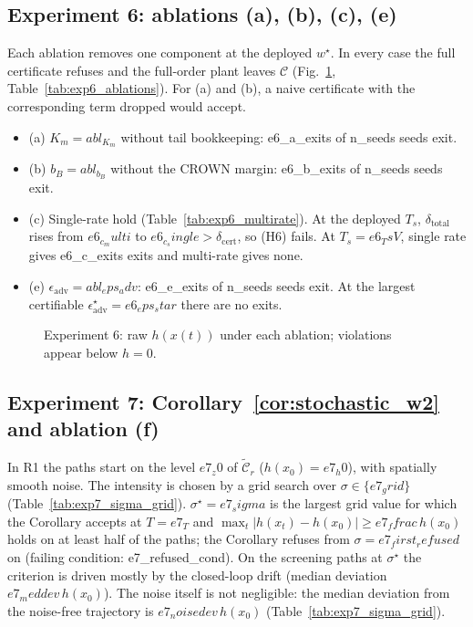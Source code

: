 \subsection{Experiment 6: ablations (a), (b), (c), (e)}
Each ablation removes one component at the deployed \(w^\star\). In every case the full certificate refuses and the
full-order plant leaves \(\mathcal C\) (Fig.~\ref{fig:exp6}, Table~\ref{tab:exp6_ablations}). For (a) and (b), a naive
certificate with the corresponding term dropped would accept.
\begin{itemize}
\item (a) \(K_m = {{abl_K_m}}\) without tail bookkeeping: {{e6_a_exits}} of {{n_seeds}} seeds exit.
\item (b) \(b_B = {{abl_b_B}}\) without the CROWN margin: {{e6_b_exits}} of {{n_seeds}} seeds exit.
\item (c) Single-rate hold (Table~\ref{tab:exp6_multirate}). At the deployed \(T_s\), \(\delta_{\mathrm{total}}\) rises from
\({{e6_c_multi}}\) to \({{e6_c_single}} > \delta_{\mathrm{cert}}\), so (H6) fails. At \(T_s = {{e6_TsV}}\), single rate gives
{{e6_c_exits}} exits and multi-rate gives none.
\item (e) \(\epsilon_{\mathrm{adv}} = {{abl_eps_adv}}\): {{e6_e_exits}} of {{n_seeds}} seeds exit. At the largest certifiable
\(\epsilon_{\mathrm{adv}}^\star = {{e6_eps_star}}\) there are no exits.
\end{itemize}

\begin{figure}[t]\centering{}
\caption{Experiment 6: raw \(h(x(t))\) under each ablation; violations appear below \(h=0\).}\label{fig:exp6}\end{figure}



\subsection{Experiment 7: Corollary~\ref{cor:stochastic_w2} and ablation (f)}
In R1 the paths start on the level \({{e7_z0}}\) of \(\tilde{\mathcal C}_r\) (\(h(x_0) = {{e7_h0}}\)), with spatially smooth
noise. The intensity is chosen by a grid search over \(\sigma \in \{{{e7_grid}}\}\) (Table~\ref{tab:exp7_sigma_grid}).
\(\sigma^\star = {{e7_sigma}}\) is the largest grid value for which the Corollary accepts at \(T = {{e7_T}}\) and
\(\max_t|h(x_t) - h(x_0)| \ge {{e7_ffrac}}\,h(x_0)\) holds on at least half of the paths; the Corollary refuses from
\(\sigma = {{e7_first_refused}}\) on (failing condition: {{e7_refused_cond}}). On the screening paths at \(\sigma^\star\) the criterion is driven mostly by the closed-loop drift (median
deviation \({{e7_meddev}}\,h(x_0)\)). The noise itself is not negligible: the median deviation from the noise-free
trajectory is \({{e7_noisedev}}\,h(x_0)\) (Table~\ref{tab:exp7_sigma_grid}).

